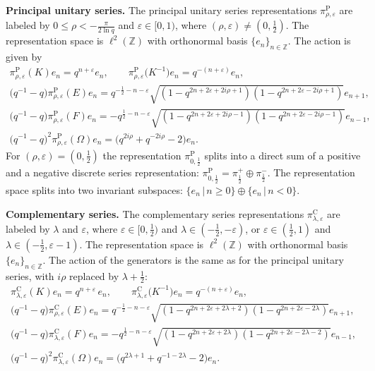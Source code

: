 \documentclass[11pt]{article}
\numberwithin{equation}{section}
\numberwithin{theorem}{section}
\numberwithin{proposition}{section}
\numberwithin{lemma}{section}
\numberwithin{corollary}{section}
\numberwithin{definition}{section}
\numberwithin{example}{section}
\numberwithin{remark}{section}
\numberwithin{note}{section}
\newcommand{\Z}{\mathbb Z}
\newcommand{\eps}{\varepsilon}
\begin{document}
\textbf{Principal unitary series.} The principal unitary series
representations $\pi^{\mathrm P}_{\rho,\eps}$ are labeled by $0\leq\rho <
-\frac{\pi}{2\ln q}$ and $\eps \in [0,1)$, where $(\rho,\eps)
\neq (0,\frac12)$. The representation space is $\ell^2(\Z)$ with
orthonormal basis $\{e_n\}_{n \in \Z}$. The action is given by
\begin{gather}
\pi^{\mathrm P}_{\rho,\eps}(K) e_n = q^{n+\eps} e_n, \qquad
\pi^{\mathrm P}_{\rho,\eps} \big(K^{-1}\big) e_n = q^{-(n+\eps)}e_n,\nonumber\\
\big(q^{-1}-q\big)\pi^{\mathrm P}_{\rho,\eps}(E) e_n = q^{-\frac12-n-\eps} \sqrt{(1-q^{2n+2\eps+2i\rho+1})
(1-q^{2n+2\eps-2i\rho+1})} e_{n+1},
\nonumber\\
\big(q^{-1}-q\big)\pi^{\mathrm P}_{\rho,\eps}(F) e_n = -q^{\frac12-n-\eps}
\sqrt{(1-q^{2n+2\eps+2i\rho-1}) (1-q^{2n+2\eps-2i\rho-1})} e_{n-1},
\nonumber\\
\big(q^{-1}-q\big)^2 \pi^{\mathrm P}_{\rho,\eps} (\Omega) e_n
=\big(q^{2i\rho}+q^{-2i\rho} -2\big) e_n.\label{eq:princ}
\end{gather}
For $(\rho,\eps)= (0,\frac12)$ the representation $\pi^{\mathrm P}_{0,\frac12}$ splits into a direct
sum of a positive and a negative discrete series representation: $\pi^{\mathrm P}_{0,\frac12}= \pi^+_\frac12
\oplus \pi^-_\frac12$. The representation space splits into two invariant subspaces: $\{ e_n\, | \, n \geq 0 \} \oplus \{e_n \, |\,
n<0 \}$.

\textbf{Complementary series.} The complementary series
representations $\pi^{\mathrm C}_{\lambda,\eps}$ are labeled by $\lambda$ and
$\eps$, where $\eps \in [0,\frac12)$ and $\lambda \in (-\frac12,-\eps)$, or
$\eps \in (\frac12,1)$ and $\lambda \in (-\frac12, \eps-1)$. The
representation space is $\ell^2(\Z)$ with orthonormal basis
$\{e_n\}_{n \in \Z}$. The action of the generators is the same as for the principal unitary series, with $i\rho$ replaced by $\lambda+\frac12$:
\begin{gather}
\pi^{\mathrm C}_{\lambda,\eps}(K) e_n = q^{n+\eps}\, e_n, \qquad
\pi^{\mathrm C}_{\lambda,\eps} \big(K^{-1}\big) e_n = q^{-(n+\eps)}e_n,\nonumber\\
\big(q^{-1}-q\big)\pi^{\mathrm C}_{\rho,\eps}(E) e_n
= q^{-\frac12-n-\eps} \sqrt{(1-q^{2n+2\eps+2\lambda+2})
(1-q^{2n+2\eps-2\lambda})} e_{n+1},
\nonumber\\
\big(q^{-1}-q\big)\pi^{\mathrm C}_{\lambda,\eps}(F) e_n = -q^{\frac12-n-\eps}
\sqrt{(1-q^{2n+2\eps+2\lambda}) (1-q^{2n+2\eps-2\lambda-2})} e_{n-1},\nonumber\\
\big(q^{-1}-q\big)^2 \pi^{\mathrm C}_{\lambda,\eps} (\Omega) e_n
=\big(q^{2\lambda+1}+q^{-1-2\lambda} -2\big) e_n.\label{eq:comp}
\end{gather}
\end{document}

